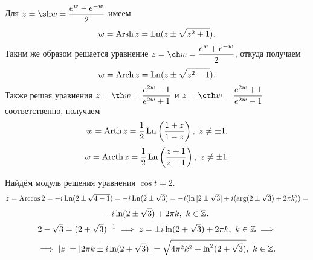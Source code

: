 \documentclass[../../main.tex]{subfiles}
\begin{document}
Для $ z = \sh w = \dfrac{e^{w} - e^{-w}}{2} $ имеем
\begin{equation}
\label{lec27:29}
w = \operatorname{Arsh} z = \operatorname{Ln}(z \pm \sqrt{z^2 + 1}).
\end{equation}
Таким же образом решается уравнение $ z = \ch w = \dfrac{e^{w} + 
e^{-w}}{2} $, откуда получаем 
\begin{equation}
\label{lec27:30}
w = \operatorname{Arch} z = \operatorname{Ln}(z \pm \sqrt{z^2 - 1}).
\end{equation}
Также решая уравнения $ z = \th 
w = \dfrac{e^{2w} - 1}{e^{2w} + 1} $ и 
$ z = \cth w = \dfrac{e^{2w} + 1}{e^{2w} - 1} $ соответственно,
получаем
\begin{equation}
\label{lec27:31}
w = \operatorname{Arth} z = \dfrac{1}{2} \operatorname{Ln}\left(\dfrac{1 + z}{1 - z}\right),\ z \neq \pm 
1,
\end{equation}
\begin{equation}
\label{lec27:32}
w = \operatorname{Arcth} z = \dfrac{1}{2} \operatorname{Ln} \left(\dfrac{z + 1}{z - 1}\right),\
z \neq \pm 1.
\end{equation}
\begin{exmp}
	Найдём модуль решения уравнения $ \cos t = 2 $.
	\[
	z = \operatorname{Arccos} 2 = -i\operatorname{Ln}(2 \pm \sqrt{4 - 1}) = 
	-i \operatorname{Ln}(2 \pm \sqrt{3}) = -i (\ln|2 \pm \sqrt{3}| + i(\arg(2 \pm \sqrt{3}) + 
	2\pi k)) = \]\[
	-i \ln(2 \pm \sqrt{3}) + 2\pi k,\ k \in \mathbb{Z}.
	\]
	\[
	2 - \sqrt{3} = (2 + \sqrt{3})^{-1} \implies
	z = \pm i \ln (2 + \sqrt{3}) + 2\pi k,\ k \in \mathbb{Z} \implies \] \[\implies
	|z| = |2\pi k \pm i\ln(2 + \sqrt{3})| = 
	\sqrt{4\pi^2 k^2 + \ln^2(2 + \sqrt{3})},\ k \in \mathbb{Z}.
	\]
\end{exmp}
\end{document}
